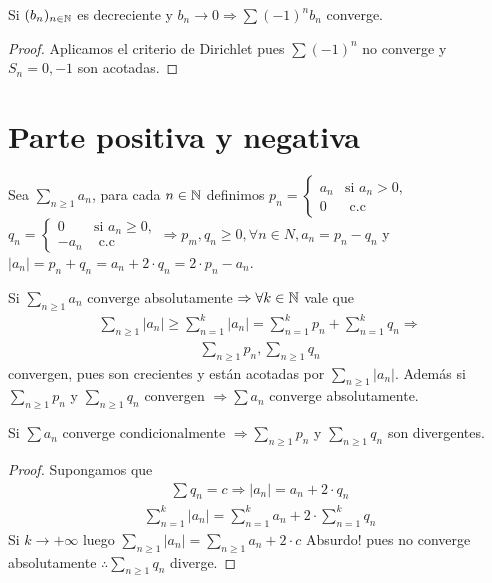 \begin{corollary}
  Si $(b_n)_{n \in \mathbb{N}}$ es decreciente y $ b_n \to 0 \Rightarrow \sum (-1)^n b_n$ converge.
  \begin{proof}
    Aplicamos el criterio de Dirichlet pues $\sum (-1)^n$ no converge y $S_n = 0, -1$ son acotadas.
  \end{proof}
\end{corollary}

\section{Parte positiva y negativa}

\begin{definition}
  Sea $\sum_{n \geq 1} a_n$, para cada $n \in \mathbb{N}$ definimos $p_n = \begin{cases}
      a_n & \text{si } a_n > 0, \\
      0   & \text{ c.c }
    \end{cases}$ \\
  $q_n = \begin{cases}
      0    & \text{si } a_n \geq 0, \\
      -a_n & \text{ c.c }
    \end{cases} \Rightarrow p_m, q_n \geq 0, \forall n \in N, a_n = p_n - q_n$ y $|a_n| = p_n + q_n = a_n + 2 \cdot q_n = 2 \cdot p_n - a_n$.
\end{definition}

\begin{note}
  Si $\sum_{n \geq 1} a_n$ converge absolutamente $\Rightarrow \forall k \in \mathbb{N}$ vale que \begin{align*}
    \sum_{n \geq 1} |a_n| \geq \sum_{n = 1}^k |a_n| = \sum_{n = 1}^k p_n + \sum_{n = 1}^k q_n \Rightarrow
  \end{align*} \begin{align*}
    \sum_{n \geq 1} p_n, \sum_{n \geq 1} q_n
  \end{align*} convergen, pues son crecientes y están acotadas por $\sum_{n \geq 1} |a_n|$. Además si $\sum_{n \geq 1} p_n$ y $\sum_{n \geq 1} q_n$ convergen $\Rightarrow \sum a_n$ converge absolutamente.
\end{note}

\clearpage

\begin{theorem}
  Si $\sum a_n$ converge condicionalmente $\Rightarrow \sum_{n \geq 1} p_n$ y $\sum_{n \geq 1} q_n$ son divergentes.

  \begin{proof}
    Supongamos que \begin{align*}
      \sum q_n = c \Rightarrow |a_n| = a_n + 2 \cdot q_n
    \end{align*}
    \begin{align*}
      \sum_{n = 1}^k |a_n| = \sum_{n = 1}^k a_n + 2 \cdot \sum_{n = 1}^k q_n
    \end{align*}
    Si $k \to +\infty$ luego $\sum_{n \geq 1} |a_n| = \sum_{n \geq 1} a_n + 2 \cdot c$ Absurdo! pues no converge absolutamente $\therefore \sum_{n \geq 1} q_n$ diverge.
  \end{proof}
\end{theorem}

